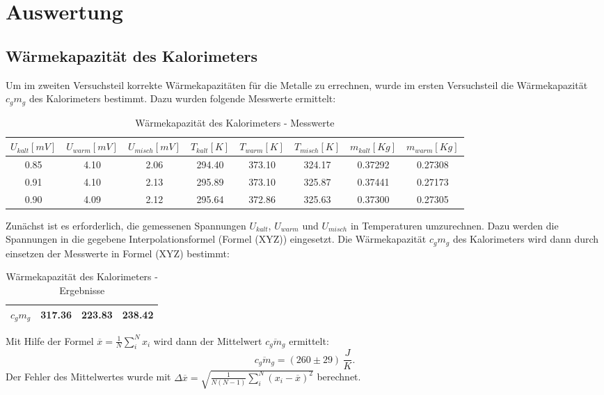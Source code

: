 \documentclass[11pt,ngerman,a4paper]{article}
\begin{document}
\section{Auswertung}
\subsection{Wärmekapazität des Kalorimeters}
Um im zweiten Versuchsteil korrekte Wärmekapazitäten für die Metalle zu errechnen, wurde im ersten Versuchsteil die Wärmekapazität $c_gm_g$ des Kalorimeters bestimmt. Dazu wurden folgende Messwerte ermittelt:
\begin{table}[H]
\centering
\begin{tabular}{|c|c|c|c|c|c|c|c|}
\hline
$U_{kalt}[mV]$ &$U_{warm}[mV]$ &$U_{misch}[mV]$ & $T_{kalt}[K]$ & $T_{warm}[K]$ & $T_{misch}[K]$ & $m_{kalt}[Kg]$ & $ m_{warm} [Kg]$ \\
\hline
0.85 & 4.10 & 2.06 & 294.40 & 373.10 & 324.17 & 0.37292 & 0.27308\\
0.91 & 4.10 & 2.13 & 295.89 & 373.10 & 325.87 & 0.37441 & 0.27173\\
0.90 & 4.09 & 2.12 & 295.64 & 372.86 & 325.63 & 0.37300 & 0.27305\\
\hline
\end{tabular}
\caption{Wärmekapazität des Kalorimeters - Messwerte}
\end{table}
\noindent
Zunächst ist es erforderlich, die gemessenen Spannungen $U_{kalt}$, $U_{warm}$ und $U_{misch}$ in Temperaturen umzurechnen. Dazu werden die Spannungen in die gegebene Interpolationsformel (Formel (XYZ)) eingesetzt. Die Wärmekapazität $c_gm_g$ des Kalorimeters wird dann durch einsetzen der Messwerte in Formel (XYZ) bestimmt:
\begin{table}[H]
\centering
\begin{tabular}{|l|c|c|c|}
\hline
$c_gm_g$ & 317.36 & 223.83 & 238.42 \\
\hline
\end{tabular}
\caption{Wärmekapazität des Kalorimeters - Ergebnisse}
\end{table}
\noindent
Mit Hilfe der Formel $ \overline{x}=\frac{1}{N}\sum_{i}^N x_i$ wird dann der Mittelwert $\overline{c_gm_g}$ ermittelt:
\[ \overline{c_gm_g}= (260 \pm 29)\,\frac{J}{K}. \]
Der Fehler des Mittelwertes wurde mit $\Delta \overline{x}=\sqrt{\frac{1}{N(N-1)}\sum_{i}^N(x_i-\overline{x})^2}$ berechnet.
\end{document}

